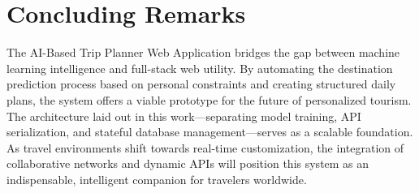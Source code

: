 \section{Concluding Remarks}

The AI-Based Trip Planner Web Application bridges the gap between machine learning intelligence and full-stack web utility. By automating the destination prediction process based on personal constraints and creating structured daily plans, the system offers a viable prototype for the future of personalized tourism. The architecture laid out in this work—separating model training, API serialization, and stateful database management—serves as a scalable foundation. As travel environments shift towards real-time customization, the integration of collaborative networks and dynamic APIs will position this system as an indispensable, intelligent companion for travelers worldwide.
